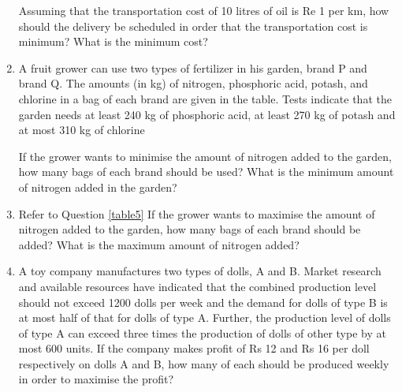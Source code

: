 \documentclass[journal,12pt,twocolumn]{IEEEtran}
\begin{document}
\begin{enumerate}
\begin{table}[h]
\centering

\caption{}
\end{table}

Assuming that the transportation cost of 10 litres of oil is Re 1 per km, how should the delivery be scheduled in order that the transportation cost is minimum? What is the minimum cost?

\item A fruit grower can use two types of fertilizer in his garden, brand P and brand Q. The amounts (in kg) of nitrogen, phosphoric acid, potash, and chlorine in a bag of each brand are given in the table. Tests indicate that the garden needs at least 240 kg of phosphoric acid, at least 270 kg of potash and at most 310 kg of chlorine

If the grower wants to minimise the amount of nitrogen added to the garden, how many bags of each brand should be used? What is the minimum amount of nitrogen added in the garden?

\begin{table}[h]
\centering

\caption{}
\label{table5}
\end{table}

\item Refer to Question \ref{table5} If the grower wants to maximise the amount of nitrogen added to the garden, how many bags of each brand should be added? What is the maximum amount of nitrogen added?

\item A toy company manufactures two types of dolls, A and B. Market research and available resources have indicated that the combined production level should not exceed 1200 dolls per week and the demand for dolls of type B is at most half of that for dolls of type A. Further, the production level of dolls of type A can exceed three times the production of dolls of other type by at most 600 units. If the company makes profit of Rs 12 and Rs 16 per doll respectively on dolls A and B, how many of each should be produced weekly in order to maximise the profit?

\end{enumerate}
\end{document}
